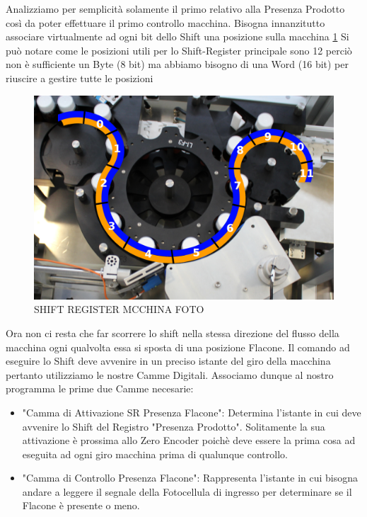 \documentclass[12pt, a4paper, oneside]{book}
\begin{document}
Analizziamo per semplicità solamente il primo relativo alla Presenza Prodotto così da poter effettuare il primo controllo macchina. Bisogna innanzitutto associare virtualmente ad ogni bit dello Shift una posizione sulla macchina \ref{sh2} Si può notare come le posizioni utili per lo Shift-Register principale sono 12 perciò non è sufficiente un Byte (8 bit) ma abbiamo bisogno di una Word (16 bit) per riuscire a gestire tutte le posizioni

\begin{figure}[H]
	\centering
	\includegraphics[width=12cm]{Immagini/SH2}
	\caption{ SHIFT REGISTER MCCHINA FOTO}
	\label{sh2}
\end{figure}

Ora non ci resta che far scorrere lo shift nella stessa direzione del flusso della macchina ogni qualvolta essa si sposta di una posizione Flacone. Il comando ad eseguire lo Shift deve avvenire in un preciso istante del giro della macchina pertanto utilizziamo le nostre Camme Digitali. Associamo dunque al nostro programma le prime due Camme necesarie:

\begin{itemize}
	\item "Camma di Attivazione SR Presenza Flacone": Determina l'istante in cui deve avvenire lo Shift del Registro "Presenza Prodotto". Solitamente la sua attivazione è prossima allo Zero Encoder poichè deve essere la prima cosa ad eseguita ad ogni giro macchina prima di qualunque controllo.
	\item "Camma di Controllo Presenza Flacone": Rappresenta l'istante in cui bisogna andare a leggere il segnale della Fotocellula di ingresso per determinare se il Flacone è presente o meno.
\end{itemize}
\end{document}
